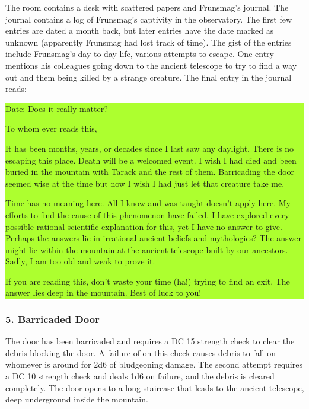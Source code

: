 \documentclass{article}
\begin{document}
\begin{multicols*}{2}
		The room contains a desk with scattered papers and Frunsmag's journal. The journal contains a log of Frunsmag's captivity in the observatory. The first few entries are dated a month back, but later entries have the date marked as unknown (apparently Frunsmag had lost track of time). The gist of the entries include Frunsmag's day to day life, various attempts to escape. One entry mentions his colleagues going down to the ancient telescope to try to find a way out and them being killed by a strange creature. The final entry in the journal reads:
		
		\colorbox{GreenYellow}{\begin{minipage}{0.4\textwidth}
				Date: Does it really matter?
				
				To whom ever reads this,
				
				It has been months, years, or decades since I last saw any daylight. There is no escaping this place. Death will be a welcomed event. I wish I had died and been buried in the mountain with Tarack and the rest of them. Barricading the door seemed wise at the time but now I wish I had just let that creature take me.
				
				Time has no meaning here. All I know and was taught doesn't apply here. My efforts to find the cause of this phenomenon have failed. I have explored every possible rational scientific explanation for this, yet I have no answer to give. Perhaps the answers lie in irrational ancient beliefs and mythologies? The answer might lie within the mountain at the ancient telescope built by our ancestors. Sadly, I am too old and weak to prove it.
				
				If you are reading this, don't waste your time (ha!) trying to find an exit. The answer lies deep in the mountain. Best of luck to you! 
				
		\end{minipage}}
		\break
		
		\subsubsection*{\underline{5. Barricaded Door}}
		The door has been barricaded and requires a DC 15 strength check to clear the debris blocking the door. A failure of on this check causes debris to fall on whomever is around for 2d6 of bludgeoning damage. The second attempt requires a DC 10 strength check and deals 1d6 on failure, and the debris is cleared completely. The door opens to a long staircase that leads to the ancient telescope, deep underground inside the mountain.
		

\end{multicols*}
\end{document}
